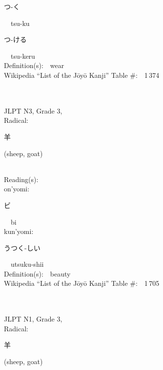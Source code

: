 \begin{multicols}{2}
{\hspace*{2em}}{\begin{CJK}{UTF8}{min} つ-く \end{CJK}}\ \ tsu-ku\ \ \\
{\hspace*{2em}}{\begin{CJK}{UTF8}{min} つ-ける \end{CJK}}\ \ tsu-keru\ \ \\
Definition(s):\ \ wear \\
Wikipedia ``List of the J\=oy\=o Kanji'' Table \#:\ \ 1\,374 \\
\ \ \\
{\fontsize{34pt}{40pt}  }\ \ \\  %
{JLPT N3, Grade 3, \\Radical:\ \ {\begin{CJK}{UTF8}{min} 羊 \end{CJK}} (sheep, goat) } \\
Reading(s):\ \ \\
{\hspace*{1em}}on'yomi:\ \ \\
{\hspace*{2em}}{\begin{CJK}{UTF8}{min} ビ \end{CJK}}\ \ bi\ \ \\
{\hspace*{1em}}kun'yomi:\ \ \\
{\hspace*{2em}}{\begin{CJK}{UTF8}{min} うつく-しい \end{CJK}}\ \ utsuku-shii\ \ \\
Definition(s):\ \ beauty \\
Wikipedia ``List of the J\=oy\=o Kanji'' Table \#:\ \ 1\,705 \\
\ \ \\
{\fontsize{34pt}{40pt}  }\ \ \\  %
{JLPT N1, Grade 3, \\Radical:\ \ {\begin{CJK}{UTF8}{min} 羊 \end{CJK}} (sheep, goat) } \\

\end{multicols}
